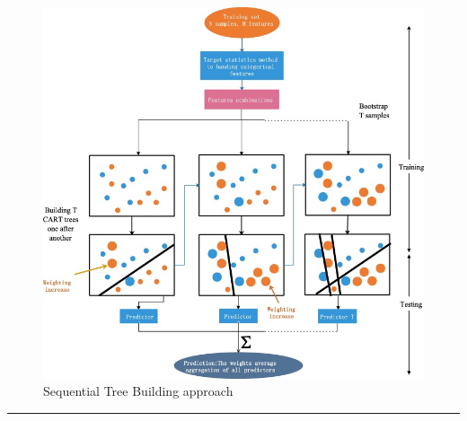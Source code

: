 \documentclass[
  letterpaper,
  DIV=11,
  numbers=noendperiod]{scrartcl}
\begin{document}
\begin{itemize}
  \begin{figure}

  {\centering \includegraphics{CaBoostPicture.jpg}

  }

  \caption{Sequential Tree Building approach}

  \end{figure}
\end{itemize}

\begin{center}\rule{0.5\linewidth}{0.5pt}\end{center}
\end{document}

